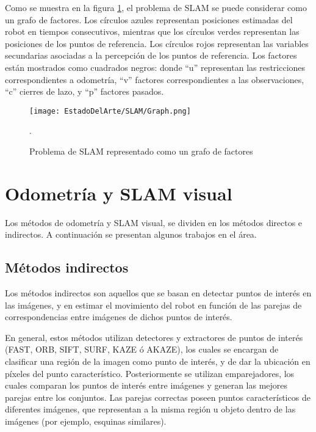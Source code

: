 Como se muestra en la figura \ref{fig:SLAMGraph}, el problema de SLAM se puede considerar como un grafo de factores. Los círculos azules representan posiciones estimadas del robot en tiempos consecutivos, mientras que los círculos verdes representan las posiciones de los puntos de referencia. Los círculos rojos representan las variables secundarias asociadas a la percepción de los puntos de referencia. Los factores están mostrados como cuadrados negros: donde  “u” representan las restricciones correspondientes a odometría, “v” factores correspondientes a las observaciones, “c” cierres de lazo, y “p” factores pasados.




\begin{figure}[H]
	\centering
	\texttt{[image: EstadoDelArte/SLAM/Graph.png]}
	\caption{Problema de SLAM representado como un grafo de factores \cite{Cadena}}.
    \label{fig:SLAMGraph}
\end{figure}



\section{Odometría  y SLAM visual}

Los métodos de odometría y SLAM visual, se dividen en los métodos directos e indirectos. A continuación se presentan algunos trabajos en el área.

\subsection{Métodos indirectos}

Los métodos indirectos son aquellos que se basan en detectar puntos de interés en las imágenes, y en estimar el movimiento del robot en función de las parejas de correspondencias entre imágenes de dichos puntos de interés.

En general, estos métodos utilizan detectores y extractores de puntos de interés (FAST, ORB, SIFT, SURF, KAZE ó AKAZE), los cuales se encargan de clasificar una región de la imagen como punto de interés, y de dar la ubicación en píxeles del punto característico. Posteriormente se utilizan emparejadores, los cuales comparan los puntos de interés entre imágenes y generan las mejores parejas entre los conjuntos. Las parejas correctas poseen puntos característicos de diferentes imágenes, que representan a la misma región u objeto dentro de las imágenes (por ejemplo, esquinas similares). 

